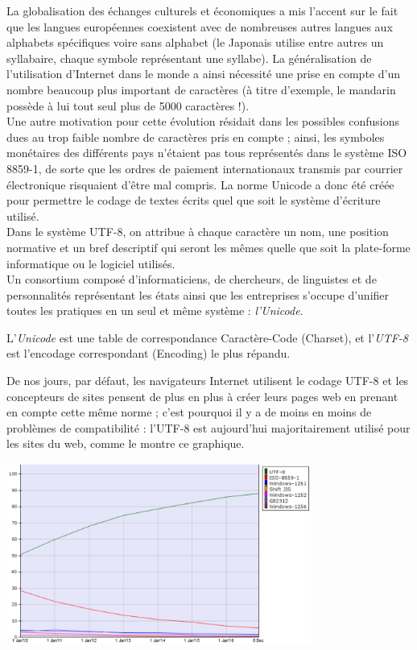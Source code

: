 La globalisation des échanges culturels et économiques a mis l'accent sur le fait que les langues européennes coexistent avec de nombreuses
autres
langues aux alphabets spécifiques voire sans alphabet (le Japonais utilise entre autres un syllabaire, chaque symbole représentant une syllabe).
La
généralisation de l'utilisation d'Internet dans le monde a ainsi nécessité une prise en compte d'un
nombre beaucoup plus important de caractères (à titre d'exemple, le mandarin possède à lui tout seul plus de 5000 caractères !).\\
Une autre motivation pour cette
évolution résidait dans les possibles confusions dues au trop faible nombre de caractères pris en compte ; ainsi, les symboles monétaires des
différents
pays n'étaient pas tous représentés dans le système ISO 8859-1, de sorte que les ordres de paiement internationaux transmis par courrier
électronique
risquaient d'être mal compris. La norme Unicode a donc été créée pour permettre le codage de textes écrits quel que soit le système d'écriture
utilisé.\\

Dans le système UTF-8, on attribue à chaque caractère un nom, une position normative et un bref descriptif qui seront les mêmes quelle que soit
la plate-forme informatique
ou le logiciel utilisés.\\
Un consortium composé d'informaticiens, de chercheurs, de linguistes et de personnalités représentant les états ainsi que les entreprises
s'occupe d'unifier toutes les pratiques en un seul et même système : \textit{l'Unicode}.\\

\begin{definition}
    L'\textit{Unicode}  est  une table de correspondance Caractère-Code (Charset), et l'\textit{UTF-8} est l'encodage correspondant (Encoding) le
    plus répandu.
\end{definition}

De nos jours, par défaut, les navigateurs Internet utilisent le codage UTF-8 et les concepteurs de sites pensent de plus en plus à créer leurs
pages web
en prenant en compte cette même norme ; c'est pourquoi il y a de moins en moins de problèmes de compatibilité : l'UTF-8 est aujourd'hui
majoritairement utilisé pour les sites du web, comme le montre ce graphique.

\begin{center}
    \includegraphics[width=10cm]{ch-texte/img/UTF8evol}
\end{center}

